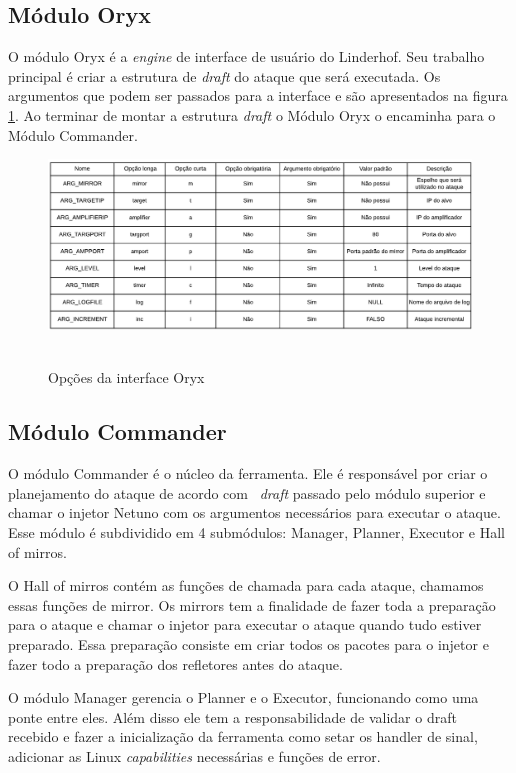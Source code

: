 \subsection{Módulo Oryx}

O módulo Oryx é a \textit{engine} de interface de usuário do Linderhof. Seu trabalho principal é criar a estrutura de \textit{draft} do ataque que será executada. Os argumentos que podem ser passados para a interface e são apresentados na figura \ref{img:optlhf}. Ao terminar de montar a estrutura \textit{draft} o Módulo Oryx o encaminha para o Módulo Commander.

\begin{figure}[H]
     \centering
     \includegraphics[scale=0.8]{img/Opcoes_lhf.pdf}\
     \caption{Opções da interface Oryx}
     \label{img:optlhf}
\end{figure}


\subsection{Módulo Commander}

O módulo Commander é o núcleo da ferramenta. Ele é responsável por criar o planejamento do ataque de acordo com \ \textit{draft} passado pelo módulo superior e chamar o injetor Netuno com os argumentos necessários para executar o ataque. Esse módulo é subdividido em 4 submódulos: Manager, Planner, Executor e Hall of mirros. 

O Hall of mirros contém as funções de chamada para cada ataque, chamamos essas funções de mirror. Os mirrors tem a finalidade de fazer toda a preparação para o ataque e chamar o injetor para executar o ataque quando tudo estiver preparado. Essa preparação consiste em criar todos os pacotes para o injetor e fazer todo a preparação dos refletores antes do ataque.

O módulo Manager gerencia o Planner e o Executor, funcionando como uma ponte entre eles. Além disso ele tem a responsabilidade de validar o draft recebido e fazer a inicialização da ferramenta como setar os handler de sinal, adicionar as Linux \textit{capabilities} necessárias e funções de error.

